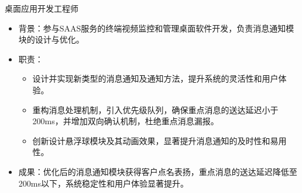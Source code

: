 \documentclass{resume}
\begin{document}
 \begin{onehalfspacing}
桌面应用开发工程师
\begin{itemize}
  \item 背景：参与SAAS服务的终端视频监控和管理桌面软件开发，负责消息通知模块的设计与优化。
  \item 职责：
    \begin{itemize}
      \item 设计并实现新类型的消息通知及通知方法，提升系统的灵活性和用户体验。
      \item 重构消息处理机制，引入优先级队列，确保重点消息的送达延迟小于200ms，并增加双向确认机制，杜绝重点消息漏报。
      \item 创新设计悬浮球模块及其动画效果，显著提升消息通知的及时性和易用性。
    \end{itemize}
  \item 成果：优化后的消息通知模块获得客户点名表扬，重点消息的送达延迟降低至200ms以下，系统稳定性和用户体验显著提升。
\end{itemize}
 \end{onehalfspacing}
 

\end{document}
